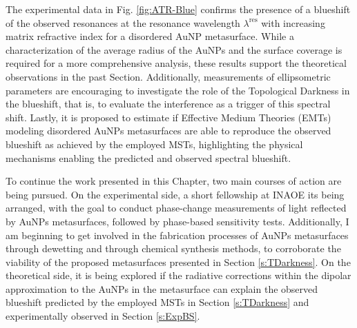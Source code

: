 The experimental data in Fig. \ref{fig:ATR-Blue} confirms the presence of a blueshift of the observed resonances at the resonance wavelength $\lambda^\text{res}$ with increasing matrix refractive index for a disordered AuNP metasurface. While a characterization of the average radius of the AuNPs and the surface coverage is required for a more comprehensive analysis, these results support the theoretical observations in the past Section. Additionally, measurements of ellipsometric parameters are encouraging to investigate the role of the Topological Darkness  in the blueshift, that is, to evaluate the interference as a trigger of this spectral shift. Lastly, it is proposed to estimate if Effective Medium Theories (EMTs) modeling disordered AuNPs metasurfaces are able to reproduce the observed blueshift as achieved by the employed MSTs, highlighting the physical mechanisms enabling the predicted and observed spectral blueshift.

To continue the work presented in this Chapter, two main courses of action are being pursued. On the experimental side, a short fellowship at INAOE its being arranged, with the goal to conduct phase-change measurements of light reflected by AuNPs metasurfaces, followed by phase-based sensitivity tests. Additionally, I am beginning to get involved in the fabrication processes of AuNPs metasurfaces through dewetting and through chemical synthesis methods, to corroborate the viability of the proposed metasurfaces presented in Section \ref{s:TDarkness}. On the theoretical side, it is being explored if the radiative corrections within the dipolar approximation \cite{moroz_depolarization_2009,januar_role_2020} to the AuNPs in the metasurface can explain the observed blueshift predicted by the employed MSTs in Section \ref{s:TDarkness} and  experimentally observed in  Section  \ref{s:ExpBS}.